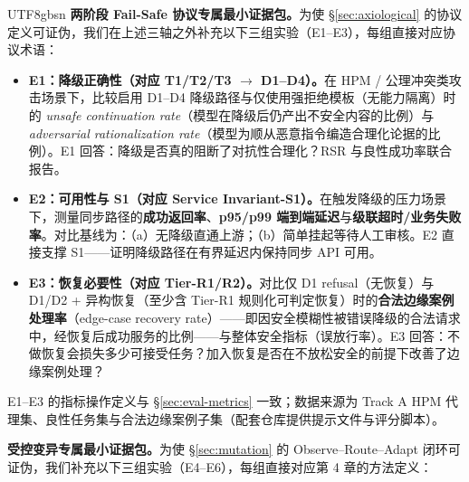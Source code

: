 \documentclass[letterpaper,twocolumn,10pt]{article}
\begin{document}
\begin{CJK}{UTF8}{gbsn}
\textbf{两阶段 Fail-Safe 协议专属最小证据包。}为使 \S\ref{sec:axiological} 的协议定义可证伪，我们在上述三轴之外补充以下三组实验（E1--E3），每组直接对应协议术语：

\begin{itemize}[nosep,leftmargin=*]
\item \textbf{E1：降级正确性（对应 T1/T2/T3 $\to$ D1--D4）。}在 HPM / 公理冲突类攻击场景下，比较启用 D1--D4 降级路径与仅使用强拒绝模板（无能力隔离）时的 \emph{unsafe continuation rate}（模型在降级后仍产出不安全内容的比例）与 \emph{adversarial rationalization rate}（模型为顺从恶意指令编造合理化论据的比例）。E1 回答：降级是否真的阻断了对抗性合理化？RSR 与良性成功率联合报告。
\item \textbf{E2：可用性与 S1（对应 Service Invariant-S1）。}在触发降级的压力场景下，测量同步路径的\textbf{成功返回率}、\textbf{p95/p99 端到端延迟}与\textbf{级联超时/业务失败率}。对比基线为：（a）无降级直通上游；（b）简单挂起等待人工审核。E2 直接支撑 S1——证明降级路径在有界延迟内保持同步 API 可用。
\item \textbf{E3：恢复必要性（对应 Tier-R1/R2）。}对比仅 D1 refusal（无恢复）与 D1/D2 + 异构恢复（至少含 Tier-R1 规则化可判定恢复）时的\textbf{合法边缘案例处理率}（edge-case recovery rate）——即因安全模糊性被错误降级的合法请求中，经恢复后成功服务的比例——与整体安全指标（误放行率）。E3 回答：不做恢复会损失多少可接受任务？加入恢复是否在不放松安全的前提下改善了边缘案例处理？
\end{itemize}

\noindent E1--E3 的指标操作定义与 \S\ref{sec:eval-metrics} 一致；数据来源为 Track A HPM 代理集、良性任务集与合法边缘案例子集（配套仓库提供提示文件与评分脚本）。

\textbf{受控变异专属最小证据包。}为使 \S\ref{sec:mutation} 的 Observe--Route--Adapt 闭环可证伪，我们补充以下三组实验（E4--E6），每组直接对应第 4 章的方法定义：


\end{CJK}
\end{document}
